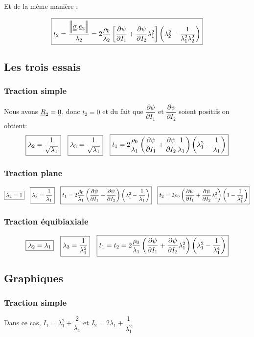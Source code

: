 \documentclass[a4paper,11pt]{article}
\begin{document}
Et de la m\^eme mani\`ere :

$$ \fbox{$t_2=\dfrac{\left\|\uuline{\sigma}.\uline{e}_2\right\|}{\lambda_2}= 2\dfrac{\rho_0}{\lambda_2}\left[\dfrac{\partial \psi}{\partial I_1}+\dfrac{\partial \psi}{\partial I_2}\lambda_1^2\right]\left(\lambda_2^2-\dfrac{1}{\lambda_1^2\lambda_2^2} \right)$}
$$

\subsection{Les trois essais}
\subsubsection{Traction simple} Nous avons $\uline{R}_2=\uline{0}$, donc $t_2=0$ et du fait que $\dfrac{\partial \psi}{\partial I_1}$ et $\dfrac{\partial \psi}{\partial I_2}$ soient positifs on obtient: $$\fbox{$\lambda_2=\dfrac{1}{\sqrt{\lambda_1}}$} \quad \fbox{$\lambda_3=\dfrac{1}{\sqrt{\lambda_1}}$} \quad \fbox{$t_1=2\dfrac{\rho_0}{\lambda_1}\left(\dfrac{\partial \psi}{\partial I_1}+\dfrac{\partial \psi}{\partial I_2}\dfrac{1}{\lambda_1} \right)\left(\lambda_1^2-\dfrac{1}{\lambda_1}\right) $}$$

\subsubsection{Traction plane} $$\fbox{$\lambda_2=1$}\quad \fbox{$ \lambda_3=\dfrac{1}{\lambda_1}$}\quad\fbox{$t_1=2\dfrac{\rho_0}{\lambda_1}\left(\dfrac{\partial \psi}{\partial I_1}+\dfrac{\partial \psi}{\partial I_2} \right)\left(\lambda_1^2-\dfrac{1}{\lambda_1}\right)$}\quad\fbox{$t_2=2\rho_0\left(\dfrac{\partial \psi}{\partial I_1}+\dfrac{\partial \psi}{\partial I_2}\lambda_1^2 \right)\left(1-\dfrac{1}{\lambda_1^2}\right)$}$$

\subsubsection{Traction équibiaxiale}$$\fbox{$\lambda_2=\lambda_1$}\quad \fbox{$ \lambda_3=\dfrac{1}{\lambda_1^2}$}\quad\fbox{$t_1=t_2=2\dfrac{\rho_0}{\lambda_1}\left(\dfrac{\partial \psi}{\partial I_1}+\dfrac{\partial \psi}{\partial I_2}\lambda_1^2 \right)\left(\lambda_1^2-\dfrac{1}{\lambda_1^4}\right)$}$$

\subsection{Graphiques}
\subsubsection{Traction simple}
Dans ce cas, $I_1=\lambda_1^2+\dfrac{2}{\lambda_1}$ et $I_2=2\lambda_1+\dfrac{1}{\lambda_1^2}$ 
\end{document}
